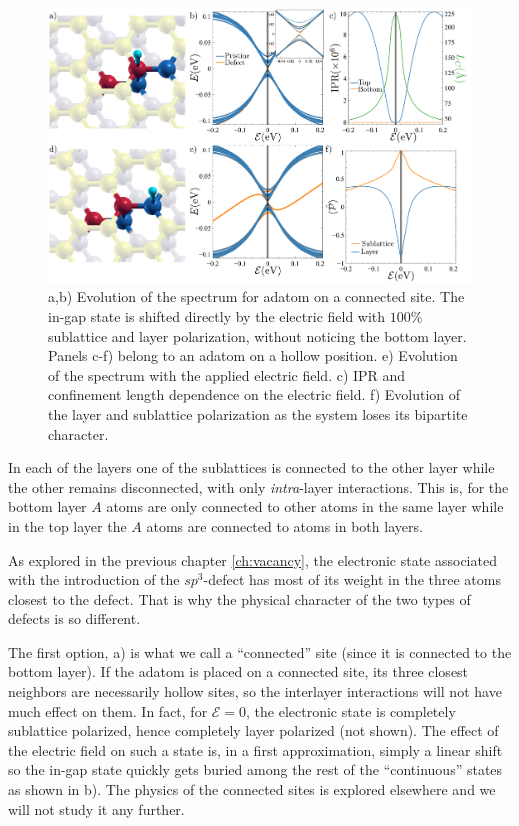 \begin{figure}[h!]
\centering
\includegraphics{defects/fig/hollow_connected.pdf}
\vspace{-20pt}
\caption{a,b) Evolution of the spectrum for adatom on a connected site. The in-gap state is shifted directly by the electric field with $100\%$ sublattice and layer polarization, without noticing the bottom layer. Panels c-f) belong to an adatom on a hollow position. e) Evolution of the spectrum with the applied electric field. c) IPR and confinement length dependence on the electric field. f) Evolution of the layer and sublattice polarization as the system loses its bipartite character.}
\label{fig:hollow-connected}
\end{figure}

In each of the layers one of the sublattices is connected to the other layer while the other remains disconnected, with only \emph{intra}-layer interactions. This is, for the bottom layer $A$ atoms are only connected to other atoms in the same layer while in the top layer the $A$ atoms are connected to atoms in both layers.
\medskip

As explored in the previous chapter \ref{ch:vacancy}, the electronic state associated with the introduction of the $sp^3$-defect has most of its weight in the three atoms closest to the defect. That is why the physical character of the two types of defects is so different.

The first option, a) is what we call a ``connected'' site (since it is connected to the bottom layer). If the  adatom is placed on a connected site, its three closest neighbors are necessarily hollow sites, so the interlayer interactions will not have much effect on them. In fact, for $\mathcal{E}=0$, the electronic state is completely sublattice polarized, hence completely layer polarized\cite{Castro2010} (not shown).
The effect of the electric field on such a state is, in a first approximation, simply a linear shift so the in-gap state quickly gets buried among the rest of the ``continuous'' states as shown in b). The physics of the connected sites is explored elsewhere\cite{Castro2010} and we will not study it any further.


